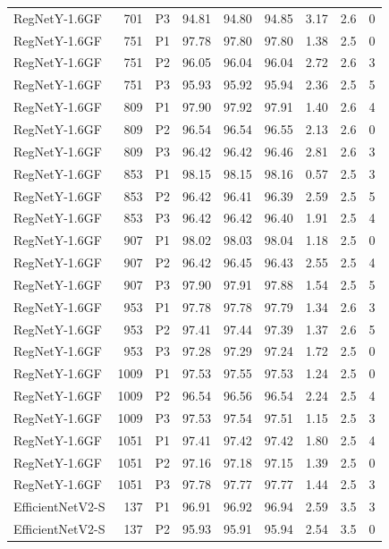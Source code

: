 {\begin{longtable}{lrlrrrrrr}
RegNetY-1.6GF & 701 & P3 & 94.81 & 94.80 & 94.85 & 3.17 & 2.6 & 0 \\
RegNetY-1.6GF & 751 & P1 & 97.78 & 97.80 & 97.80 & 1.38 & 2.5 & 0 \\
RegNetY-1.6GF & 751 & P2 & 96.05 & 96.04 & 96.04 & 2.72 & 2.6 & 3 \\
RegNetY-1.6GF & 751 & P3 & 95.93 & 95.92 & 95.94 & 2.36 & 2.5 & 5 \\
RegNetY-1.6GF & 809 & P1 & 97.90 & 97.92 & 97.91 & 1.40 & 2.6 & 4 \\
RegNetY-1.6GF & 809 & P2 & 96.54 & 96.54 & 96.55 & 2.13 & 2.6 & 0 \\
RegNetY-1.6GF & 809 & P3 & 96.42 & 96.42 & 96.46 & 2.81 & 2.6 & 3 \\
RegNetY-1.6GF & 853 & P1 & 98.15 & 98.15 & 98.16 & 0.57 & 2.5 & 3 \\
RegNetY-1.6GF & 853 & P2 & 96.42 & 96.41 & 96.39 & 2.59 & 2.5 & 5 \\
RegNetY-1.6GF & 853 & P3 & 96.42 & 96.42 & 96.40 & 1.91 & 2.5 & 4 \\
RegNetY-1.6GF & 907 & P1 & 98.02 & 98.03 & 98.04 & 1.18 & 2.5 & 0 \\
RegNetY-1.6GF & 907 & P2 & 96.42 & 96.45 & 96.43 & 2.55 & 2.5 & 4 \\
RegNetY-1.6GF & 907 & P3 & 97.90 & 97.91 & 97.88 & 1.54 & 2.5 & 5 \\
RegNetY-1.6GF & 953 & P1 & 97.78 & 97.78 & 97.79 & 1.34 & 2.6 & 3 \\
RegNetY-1.6GF & 953 & P2 & 97.41 & 97.44 & 97.39 & 1.37 & 2.6 & 5 \\
RegNetY-1.6GF & 953 & P3 & 97.28 & 97.29 & 97.24 & 1.72 & 2.5 & 0 \\
RegNetY-1.6GF & 1009 & P1 & 97.53 & 97.55 & 97.53 & 1.24 & 2.5 & 0 \\
RegNetY-1.6GF & 1009 & P2 & 96.54 & 96.56 & 96.54 & 2.24 & 2.5 & 4 \\
RegNetY-1.6GF & 1009 & P3 & 97.53 & 97.54 & 97.51 & 1.15 & 2.5 & 3 \\
RegNetY-1.6GF & 1051 & P1 & 97.41 & 97.42 & 97.42 & 1.80 & 2.5 & 4 \\
RegNetY-1.6GF & 1051 & P2 & 97.16 & 97.18 & 97.15 & 1.39 & 2.5 & 0 \\
RegNetY-1.6GF & 1051 & P3 & 97.78 & 97.77 & 97.77 & 1.44 & 2.5 & 3 \\
EfficientNetV2-S & 137 & P1 & 96.91 & 96.92 & 96.94 & 2.59 & 3.5 & 3 \\
EfficientNetV2-S & 137 & P2 & 95.93 & 95.91 & 95.94 & 2.54 & 3.5 & 0 \\

\end{longtable}}
